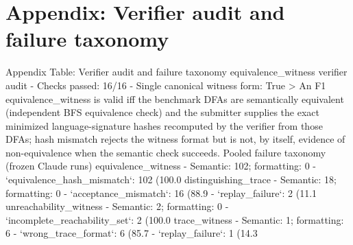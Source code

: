 \section*{Appendix: Verifier audit and failure taxonomy}

 Appendix Table: Verifier audit and failure taxonomy
 equivalence_witness verifier audit
- Checks passed: 16/16
- Single canonical witness form: True
> An F1 equivalence_witness is valid iff the benchmark DFAs are semantically equivalent (independent BFS equivalence check) and the submitter supplies the exact minimized language-signature hashes recomputed by the verifier from those DFAs; hash mismatch rejects the witness format but is not, by itself, evidence of non-equivalence when the semantic check succeeds.
 Pooled failure taxonomy (frozen Claude runs)
 equivalence_witness
- Semantic: 102; formatting: 0
- `equivalence_hash_mismatch`: 102 (100.0%
 distinguishing_trace
- Semantic: 18; formatting: 0
- `acceptance_mismatch`: 16 (88.9%
- `replay_failure`: 2 (11.1%
 unreachability_witness
- Semantic: 2; formatting: 0
- `incomplete_reachability_set`: 2 (100.0%
 trace_witness
- Semantic: 1; formatting: 6
- `wrong_trace_format`: 6 (85.7%
- `replay_failure`: 1 (14.3%